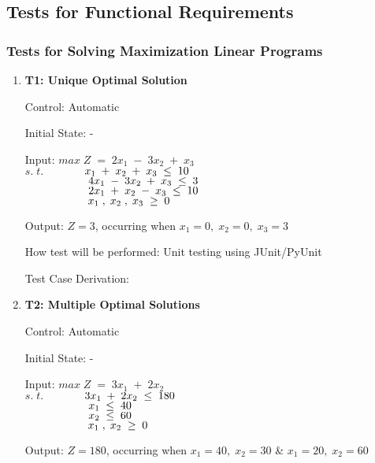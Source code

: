 \documentclass[12pt, titlepage]{article}
\begin{document}
\subsection{Tests for Functional Requirements}

\subsubsection{Tests for Solving Maximization Linear Programs}

\begin{enumerate}
	\item{\textbf{T1: Unique Optimal Solution}}
	
	Control: Automatic 
	
	Initial State: -
	
	Input: $max\;Z\;=\;2x_1\;-\;3x_2\;+\;x_3$\\
	$s.\;t.$$\hspace*{1.3cm} x_1\;+\;x_2\;+\;x_3\; \leq \;10$\\
	$\hspace*{2cm} 4x_1\;-\;3x_2\;+\;x_3\; \leq \;3$\\
	$\hspace*{2cm} 2x_1\;+\;x_2\;-\;x_3\; \leq \;10$\\
	$\hspace*{2cm} x_1\;,\;x_2\;,\;x_3\; \geq \;0$
	
	Output: $Z = 3$, occurring when $x_1=0,\;x_2=0,\;x_3=3$
	
	How test will be performed: Unit testing using JUnit/PyUnit
	
	Test Case Derivation: 

	\item{\textbf{T2: Multiple Optimal Solutions}}
	
	Control: Automatic 
	
	Initial State: -
	
	Input: $max\;Z\;=\;3x_1\;+\;2x_2$\\
	$s.\;t.$$\hspace*{1.3cm} 3x_1\;+\;2x_2\; \leq \;180$\\
	$\hspace*{2cm} x_1\; \leq \;40$\\
	$\hspace*{2cm} x_2\; \leq \;60$\\
	$\hspace*{2cm} x_1\;,\;x_2\; \geq \;0$
	
	Output: $Z = 180$, occurring when $x_1=40,\;x_2=30$ \& $x_1=20,\;x_2=60$
	

\end{enumerate}
\end{document}

